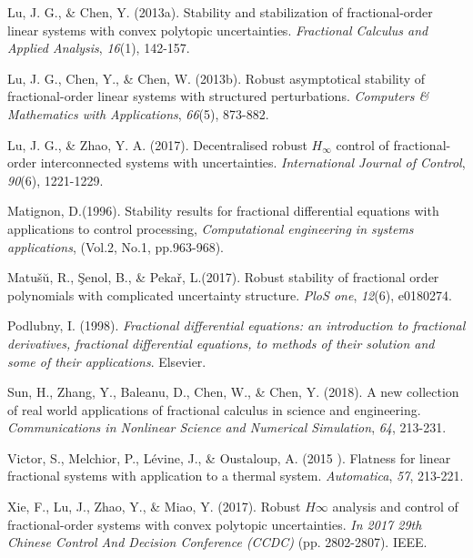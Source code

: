\documentclass[]{interact}
\theoremstyle{plain}%
\theoremstyle{definition}
\theoremstyle{remark}
\begin{document}
\begin{thebibliography}{}
	Lu, J. G., \& Chen, Y. (2013a). Stability and stabilization of fractional-order linear systems with convex polytopic uncertainties. \emph{Fractional Calculus and Applied Analysis}, \emph{16}(1), 142-157.
	
	\label{key}
	Lu, J. G., Chen, Y., \& Chen, W. (2013b). Robust asymptotical stability of fractional-order linear systems with structured perturbations. \emph{Computers \& Mathematics with Applications}, \emph{66}(5), 873-882.
	
	Lu, J. G., \& Zhao, Y. A. (2017). Decentralised robust $H_\infty$ control of fractional-order interconnected systems with uncertainties. \emph{International Journal of Control}, \emph{90}(6), 1221-1229. 
	
	Matignon, D.(1996). Stability results for fractional differential equations with applications to control processing, \emph{Computational engineering in systems applications}, (Vol.2, No.1, pp.963-968).
	
     Matu{\v{s}}{\u{u}}, R., \c{S}enol, B., \& Peka\v{r}, L.(2017). Robust stability of fractional order polynomials with complicated uncertainty structure. \emph{PloS one}, \emph{12}(6), e0180274.
    
    Podlubny, I. (1998). \emph{Fractional differential equations: an introduction to fractional derivatives, fractional differential equations, to methods of their solution and some of their applications}. Elsevier.
    
    Sun, H., Zhang, Y., Baleanu, D., Chen, W., \& Chen, Y. (2018). A new collection of real world applications of fractional calculus in science and engineering. \emph{Communications in Nonlinear Science and Numerical Simulation}, \emph{64}, 213-231.
    
    Victor, S., Melchior, P., L{\'e}vine, J., \& Oustaloup, A. (2015 ). Flatness for linear fractional systems with application to a thermal system. \emph{Automatica}, \emph{57}, 213-221.
    
    Xie, F., Lu, J., Zhao, Y., \& Miao, Y. (2017). Robust $H\infty$ analysis and control of fractional-order systems with convex polytopic uncertainties. \emph{In 2017 29th Chinese Control And Decision Conference (CCDC)} (pp. 2802-2807). IEEE.
    

\end{thebibliography}
\end{document}

